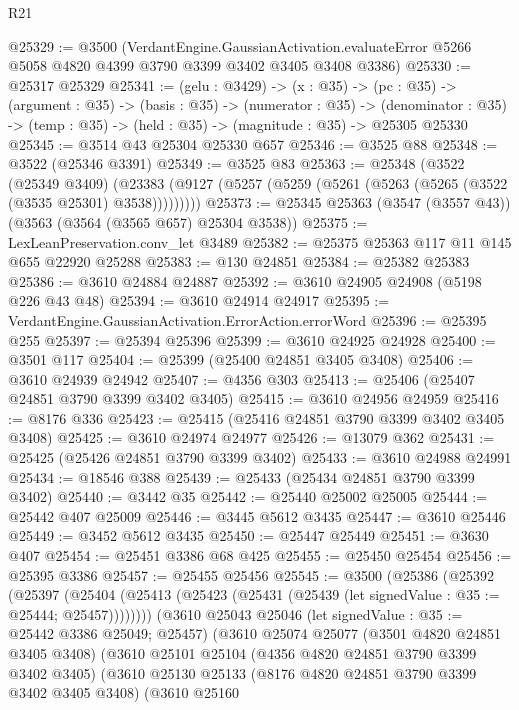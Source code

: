 \begin{lexlean}{R21}
\begin{coremodule}
@25329 := @3500
    (VerdantEngine.GaussianActivation.evaluateError
      @5266
      @5058
      @4820
      @4399
      @3790
      @3399
      @3402
      @3405
      @3408
      @3386)
@25330 := @25317 @25329
@25341 := (gelu : @3429) ->
  (x : @35) ->
  (pc : @35) ->
  (argument : @35) ->
  (basis : @35) ->
  (numerator : @35) ->
  (denominator : @35) -> (temp : @35) -> (held : @35) -> (magnitude : @35) -> @25305 @25330
@25345 := @3514 @43 @25304 @25330 @657
@25346 := @3525 @88
@25348 := @3522 (@25346 @3391)
@25349 := @3525 @83
@25363 := @25348
    (@3522
      (@25349 @3409)
      (@23383 (@9127 (@5257 (@5259 (@5261 (@5263 (@5265 (@3522 (@3535 @25301) @3538)))))))))
@25373 := @25345 @25363 (@3547 (@3557 @43)) (@3563 (@3564 (@3565 @657) @25304 @3538))
@25375 := LexLeanPreservation.conv_let @3489
@25382 := @25375 @25363 @117 @11 @145 @655 @22920 @25288
@25383 := @130 @24851
@25384 := @25382 @25383
@25386 := @3610 @24884 @24887
@25392 := @3610 @24905 @24908 (@5198 @226 @43 @48)
@25394 := @3610 @24914 @24917
@25395 := VerdantEngine.GaussianActivation.ErrorAction.errorWord
@25396 := @25395 @255
@25397 := @25394 @25396
@25399 := @3610 @24925 @24928
@25400 := @3501 @117
@25404 := @25399 (@25400 @24851 @3405 @3408)
@25406 := @3610 @24939 @24942
@25407 := @4356 @303
@25413 := @25406 (@25407 @24851 @3790 @3399 @3402 @3405)
@25415 := @3610 @24956 @24959
@25416 := @8176 @336
@25423 := @25415 (@25416 @24851 @3790 @3399 @3402 @3405 @3408)
@25425 := @3610 @24974 @24977
@25426 := @13079 @362
@25431 := @25425 (@25426 @24851 @3790 @3399 @3402)
@25433 := @3610 @24988 @24991
@25434 := @18546 @388
@25439 := @25433 (@25434 @24851 @3790 @3399 @3402)
@25440 := @3442 @35
@25442 := @25440 @25002 @25005
@25444 := @25442 @407 @25009
@25446 := @3445 @5612 @3435
@25447 := @3610 @25446
@25449 := @3452 @5612 @3435
@25450 := @25447 @25449
@25451 := @3630 @407
@25454 := @25451 @3386 @68 @425
@25455 := @25450 @25454
@25456 := @25395 @3386
@25457 := @25455 @25456
@25545 := @3500
    (@25386
      (@25392
        (@25397
          (@25404 (@25413 (@25423 (@25431 (@25439 (let signedValue : @35 := @25444; @25457))))))))
      (@3610
        @25043
        @25046
        (let signedValue : @35 := @25442 @3386 @25049; @25457)
        (@3610
          @25074
          @25077
          (@3501 @4820 @24851 @3405 @3408)
          (@3610
            @25101
            @25104
            (@4356 @4820 @24851 @3790 @3399 @3402 @3405)
            (@3610
              @25130
              @25133
              (@8176 @4820 @24851 @3790 @3399 @3402 @3405 @3408)
              (@3610
                @25160

\end{coremodule}
\end{lexlean}
